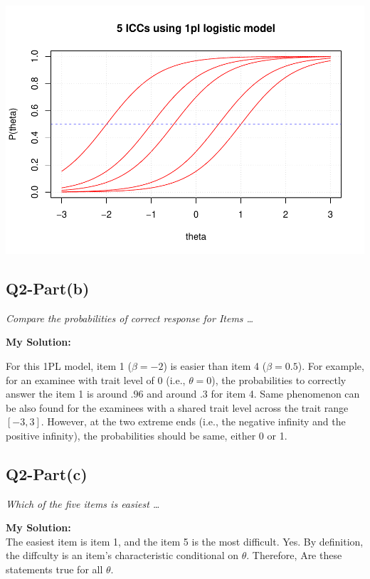 \documentclass[
]{article}
\begin{document}
\includegraphics{Assignment_1_files/figure-latex/unnamed-chunk-9-1.pdf}

\hypertarget{q2-partb}{%
\subsection{Q2-Part(b)}\label{q2-partb}}

\emph{Compare the probabilities of correct response for Items \ldots{}}

\textbf{My Solution: }

For this 1PL model, item 1 (\(\beta=-2\)) is easier than item 4
(\(\beta=0.5\)). For example, for an examinee with trait level of 0
(i.e., \(\theta = 0\)), the probabilities to correctly answer the item 1
is around \(.96\) and around \(.3\) for item 4. Same phenomenon can be
also found for the examinees with a shared trait level across the trait
range \([-3,3]\). However, at the two extreme ends (i.e., the negative
infinity and the positive infinity), the probabilities should be same,
either 0 or 1.

\hypertarget{q2-partc}{%
\subsection{Q2-Part(c)}\label{q2-partc}}

\emph{Which of the five items is easiest \ldots{}}

\textbf{My Solution: }\\
The easiest item is item 1, and the item 5 is the most difficult. Yes.
By definition, the diffculty is an item's characteristic conditional on
\(\theta\). Therefore, Are these statements true for all \(\theta\).
\end{document}
